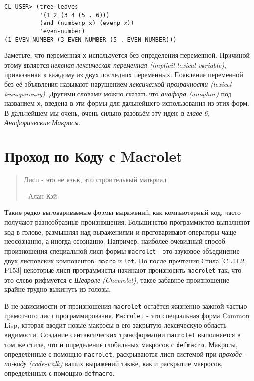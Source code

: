 \begin{verbatim}
CL-USER> (tree-leaves
          '(1 2 (3 4 (5 . 6)))
          (and (numberp x) (evenp x))
          'even-number)
(1 EVEN-NUMBER (3 EVEN-NUMBER (5 . EVEN-NUMBER)))
\end{verbatim}

Заметьте, что переменная \verb"x" используется без определения переменной. Причиной этому является \emph{неявная лексическая переменная (implicit lexical variable)}, привязанная к каждому из двух последних переменных. Появление переменной без её объявления называют нарушением \emph{лексической прозрачности (lexical transparency)}. Другими словами можно сказать что \emph{анафора (anaphor)} под названием \verb"x", введена в эти формы для дальнейшего использования из этих форм. В дальнейшем мы очень, очень сильно разовьём эту идею в \emph{главе 6, Анафорические Макросы}.

\section{Проход по Коду с Macrolet}\label{section_code-walking_with_macrolet}

\begin{quote}
Лисп - это не язык, это строительный материал

- Алан Кэй
\end{quote}

Такие редко выговариваемые формы выражений, как компьютерный код, часто получают разнообразные произношения. Большинство программистов выполняют код в голове, размышляя над выражениями и проговаривают операторы чаще неосознанно, а иногда осознанно. Например, наиболее очевидный способ произношения специальной лисп формы \verb"macrolet" - это звуковое объединение двух лисповских компонентов: \verb"macro" и \verb"let". Но после прочтения Стила [CLTL2-P153] некоторые лисп программисты начинают произносить \verb"macrolet" так, что это слово рифмуется с \emph{Шевроле (Chevrolet)}, такое забавное произношение крайне трудно выкинуть из головы.

В не зависимости от произношения \verb"macrolet" остаётся жизненно важной частью грамотного лисп программирования. \verb"Macrolet" - это специальная форма Common Lisp, которая вводит новые макросы в его закрытую лексическую область видимости. Создание синтаксических трансформаций \verb"macrolet" выполняется в том же стиле, что и определение глобальных макросов с \verb"defmacro". Макросы, определённые с помощью \verb"macrolet", раскрываются лисп системой при \emph{проходе-по-коду (code-walk)} ваших выражений также, как и раскрытие макросов, определённых с помощью \verb"defmacro".

